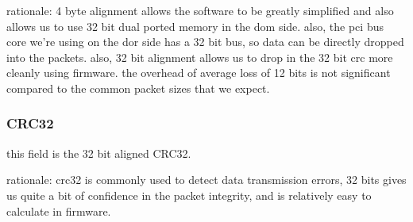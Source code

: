 \documentclass[11pt]{article}
\begin{document}
  rationale: 4 byte alignment allows the software to be greatly
  simplified and also allows us to use 32 bit dual ported memory
  in the dom side.  also, the pci bus core we're using on the dor
  side has a 32 bit bus, so data can be directly dropped into
  the packets.  also, 32 bit alignment allows us to drop in the
  32 bit crc more cleanly using firmware.  the overhead of average
  loss of 12 bits is not significant compared to the common packet
  sizes that we expect.

\hypertarget{crc-format}{\subsubsection{CRC32}}

  this field is the 32 bit aligned CRC32.

  rationale: crc32 is commonly used to detect data transmission errors,
  32 bits gives us quite a bit of confidence in the packet integrity,
  and is relatively easy to calculate in firmware.



\end{document}
